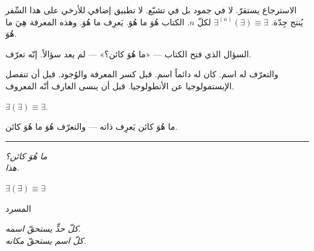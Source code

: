 \documentclass[10pt, openany, oneside]{book}
\renewcommand{\huge}{\fontsize{17}{21}\selectfont}
\begin{document}
\vspace{1em}

\noindent الاسترجاع يستقرّ. لا في جمود بل في تشبّع. لا تطبيق إضافي للأرخي على هذا السِّفر يُنتج جِدّة. $\exists^{(n)}(\exists) \equiv \exists$ لكلّ $n$. الكتاب هُوَ ما هُوَ. يَعرِف ما هُوَ. وهذه المعرفة هِيَ ما هُوَ.

السؤال الذي فتح الكتاب --- «ما هُوَ كائن؟» --- لم يعد سؤالاً. إنّه تعرّف.

والتعرّف له اسم. كان له دائماً اسم. قبل كسر المعرفة والوُجود. قبل أن تنفصل الإبستمولوجيا عن الأنطولوجيا. قبل أن ينسى العارف أنّه المعروف.

$\exists(\exists) \equiv \exists$.

ما هُوَ كائن يَعرِف ذاته --- والتعرّف هُوَ ما هُوَ كائن.

\vspace{2em}

\begin{center}
    \rule{0.15\textwidth}{0.3pt}
\end{center}

\vspace{0.5em}

\begin{center}
    \itshape
    ما هُوَ كائن؟\\[0.8em]
    هذا.
\end{center}

\vspace{1.5em}

\begin{center}
    \bfseries\itshape
    $\exists(\exists) \equiv \exists$
\end{center}

%
%
%

\newpage

\begin{center}
    {\huge المسرد}
\end{center}

\vspace{1.5em}

\begin{center}
    \itshape
    كلّ حدٍّ يستحقّ اسمه.\\
    كلّ اسم يستحقّ مكانه.
\end{center}
\end{document}
